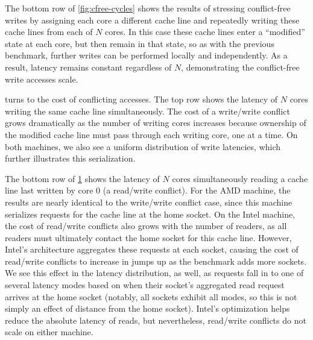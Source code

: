 The bottom row of \cref{fig:cfree-cycles} shows the results of
stressing conflict-free writes by assigning each core a different
cache line and repeatedly writing these cache lines from each of $N$
cores.  In this case these cache lines enter a ``modified'' state at
each core, but then remain in that state, so as with the previous
benchmark, further writes can be performed locally and independently.
As a result, latency remains constant regardless of $N$, demonstrating
the conflict-free write accesses scale.

\begin{figure}
  \centering
  
  \label{fig:conflict-cycles}
\end{figure}

 turns to the cost of conflicting
accesses.  The top row shows the latency of $N$ cores writing the same
cache line simultaneously.  The cost of a write/write conflict grows
dramatically as the number of writing cores increases because
ownership of the modified cache line must pass through each writing
core, one at a time.  On both machines, we also see a uniform
distribution of write latencies, which further illustrates this
serialization.

The bottom row of \cref{fig:conflict-cycles} shows the latency of $N$
cores simultaneously reading a cache line last written by core 0 (a
read/write conflict).  For the AMD machine, the results are nearly
identical to the write/write conflict case, since this machine
serializes requests for the cache line at the home socket.  On the
Intel machine, the cost of read/write conflicts also grows with the
number of readers, as all readers must ultimately contact the home
socket for this cache line.  However, Intel's architecture aggregates
these requests at each socket, causing the cost of read/write
conflicts to increase in jumps up as the benchmark adds more sockets.
We see this effect in the latency distribution, as well, as requests
fall in to one of several latency modes based on when their socket's
aggregated read request arrives at the home socket (notably, all
sockets exhibit all modes, so this is not simply an effect of distance
from the home socket).  Intel's optimization helps reduce the absolute
latency of reads, but nevertheless, read/write conflicts do not scale
on either machine.


